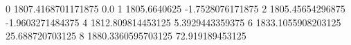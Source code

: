0 1807.4168701171875 0.0
1 1805.6640625 -1.7528076171875
2 1805.45654296875 -1.9603271484375
4 1812.809814453125 5.3929443359375
6 1833.1055908203125 25.688720703125
8 1880.3360595703125 72.919189453125
